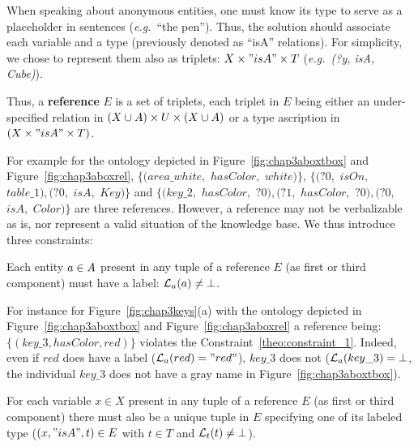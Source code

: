 \documentclass[a4paper,11pt,twoside]{StyleThese}
\begin{document}
When speaking about anonymous entities, one must know its type to serve as a placeholder in sentences (\textit{e.g.}~``the pen'').
Thus, the solution should associate each variable and a type (previously denoted as ``isA'' relations). For simplicity, we chose to represent them also as triplets: $X \times "isA" \times T$ (\textit{e.g.}~\textit{(?y, isA, Cube)}). 

\begin{definition}[Reference]
\label{def:reference}
Thus, a \textbf{reference} $E$ is a set of triplets, each triplet in $E$ being either an under-specified relation in $(X \cup A) \times U \times (X \cup A)$ or a type ascription in  $(X \times "isA" \times T)$.
\end{definition}

For example for the ontology depicted in Figure~\ref{fig:chap3aboxtbox} and Figure~\ref{fig:chap3aboxrel}, $\{(area\_white,$ $hasColor,$ $white)\}$, $\{(?0,$ $isOn,$ $table\_1), (?0,$ $isA,$ $Key)\}$ and $\{(key\_2,$ $hasColor,$ $?0), (?1,$ $hasColor,$ $?0), (?0,$ $isA,$ $Color)\}$ are three references. However, a reference may not be verbalizable as is, nor represent a valid situation of the knowledge base. We thus introduce three constraints:

\begin{constraint}
\label{theo:constraint_1}
Each entity $a \in A$ present in any tuple of a reference $E$ (as first or third component) must have a label: $\mathcal{L}_a(a) \neq \bot$.
\end{constraint}

For instance for Figure~\ref{fig:chap3keys}(a) with the ontology depicted in Figure~\ref{fig:chap3aboxtbox} and Figure~\ref{fig:chap3aboxrel} a reference being: $\{(key\_3, hasColor, red)\}$ violates the Constraint~\ref{theo:constraint_1}. Indeed, even if $red$ does have a label ($\mathcal{L}_a(red) = "red"$), $key\_3$ does not ($\mathcal{L}_a(key\_3) = \bot$, the individual $key\_3$ does not have a gray name in Figure~\ref{fig:chap3aboxtbox}).

\begin{constraint}
\label{theo:constraint_2}
For each variable $x \in X$ present in any tuple of a reference $E$ (as first or third component) there must also be a unique tuple in $E$ specifying one of its labeled type ($(x, "isA", t) \in E$ with $t \in T$ and $\mathcal{L}_t(t) \neq \bot$).
\end{constraint}
\end{document}
